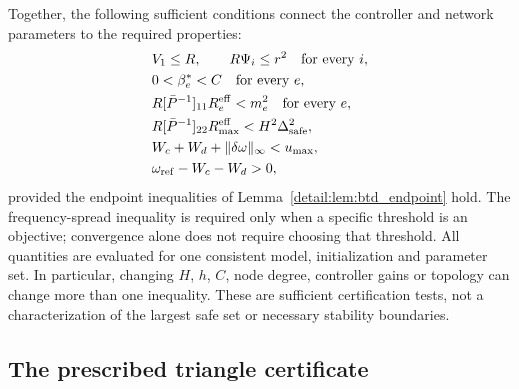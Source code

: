 Together, the following sufficient conditions connect the controller
and network parameters to the required properties:
\begin{align}
 &V_1\le R,\qquad R\Psi_i\le r^2\quad\text{for every }i,\nonumber\\
 &0<\beta_e^*<C\quad\text{for every }e,\nonumber\\
 &R[\bar P^{-1}]_{11}R_e^{\rm eff}<m_e^2
       \quad\text{for every }e,\nonumber\\
 &R[\bar P^{-1}]_{22}R_{\max}^{\rm eff}
       <H^2\Delta_{\rm safe}^2,\nonumber\\
 &W_c+W_d+\|\delta\omega\|_\infty<u_{\max},\nonumber\\
 &\omega_{\rm ref}-W_c-W_d>0,
 \label{detail:eq:btd_joint_sufficient_conditions}
\end{align}
provided the endpoint inequalities of Lemma~\ref{detail:lem:btd_endpoint} hold.
The frequency-spread inequality is required only when a specific threshold
is an objective; convergence alone does not require choosing that threshold.
All quantities are evaluated for one consistent model, initialization
and parameter set. In particular, changing $H$, $h$, $C$, node degree,
controller gains or topology can change more than one inequality.
These are sufficient certification tests, not a characterization of the
largest safe set or necessary stability boundaries.

\subsection{The prescribed triangle certificate}

